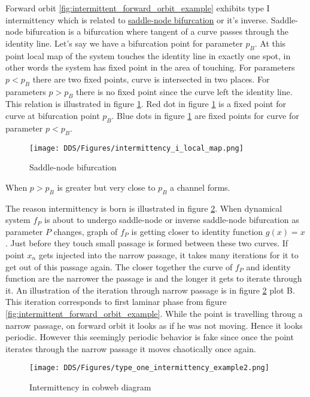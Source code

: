 Forward orbit \ref{fig:intermittent_forward_orbit_example} exhibits type I intermittency which is related to \hyperref[def:saddle_node_bif]{saddle-node bifurcation} or it's inverse.
Saddle-node bifurcation is a bifurcation where tangent of a curve passes through the identity line.
Let's say we have a bifurcation point for parameter $p_{B}$.
At this point local map of the system touches the identity line in exactly one spot, in other words the system has fixed point in the area of touching.
For parameters $p < p_{B}$ there are two fixed points, curve is intersected in two places.
For parameters $p > p_{B}$ there is no fixed point since the curve left the identity line.
This relation is illustrated in figure \ref{fig:saddle_node_bifurcation}.
Red dot in figure \ref{fig:saddle_node_bifurcation} is a fixed point for curve at bifurcation point $p_{B}$.
Blue dots in figure \ref{fig:saddle_node_bifurcation} are fixed points for curve for parameter $p < p_{B}$.
\begin{figure}[!h]
    \centering
    \texttt{[image: DDS/Figures/intermittency\_i\_local\_map.png]}
    \caption{Saddle-node bifurcation}
    \label{fig:saddle_node_bifurcation}
\end{figure}

When $p > p_{B}$ is greater but very close to $p_{B}$ a channel forms.

The reason intermittency is born is illustrated in figure \ref{fig:intermittent_cobweb_example}.
When dynamical system $f_P$ is about to undergo saddle-node or inverse saddle-node bifurcation as parameter $P$ changes, graph of $f_P$ is getting closer to identity function $g(x)=x$.
Just before they touch small passage is formed between these two curves.
If point $x_n$ gets injected into the narrow passage, it takes many iterations for it to get out of this passage again.
The closer together the curve of $f_P$ and identity function are the narrower the passage is and the longer it gets to iterate through it.
An illustration of the iteration through narrow passage is in figure \ref{fig:intermittent_cobweb_example} plot B.
This iteration corresponds to first laminar phase from figure \ref{fig:intermittent_forward_orbit_example}.
While the point is travelling throug a narrow passage, on forward orbit it looks as if he was not moving.
Hence it looks periodic.
However this seemingly periodic behavior is fake since once the point iterates through the narrow passage it moves chaotically once again.

\begin{figure}[!h]
    \centering
    \texttt{[image: DDS/Figures/type\_one\_intermittency\_example2.png]}
    \caption{Intermittency in cobweb diagram}
    \label{fig:intermittent_cobweb_example}
\end{figure}


